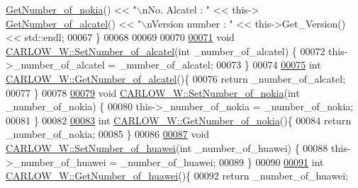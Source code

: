 \begin{DoxyCode}
      \hyperlink{class_c_a_r_l_o_w___w_a4e3a644ee69bc4bc4ab3feac1493192b}{GetNumber\_of\_nokia}() << \textcolor{stringliteral}{"\(\backslash\)nNo. Alcatel : "} << this->
      \hyperlink{class_c_a_r_l_o_w___w_ae7ab8852e5eeff1c2cd397126fbac0e7}{GetNumber\_of\_alcatel}() << \textcolor{stringliteral}{"\(\backslash\)nVersion number : "} << this->Get\_Version() << std::endl;
00067 \}
00068 
00069 
00070 
\hypertarget{_c_a_r_l_o_w___w_8cpp_source.tex_l00071}{}\hyperlink{class_c_a_r_l_o_w___w_ad264954806d7fd6c418650a5c7c7defb}{00071} \textcolor{keywordtype}{void} \hyperlink{class_c_a_r_l_o_w___w_ad264954806d7fd6c418650a5c7c7defb}{CARLOW\_W::SetNumber\_of\_alcatel}(\textcolor{keywordtype}{int} \_number\_of\_alcatel) \{
00072     this->\_number\_of\_alcatel = \_number\_of\_alcatel;
00073 \}
00074 
\hypertarget{_c_a_r_l_o_w___w_8cpp_source.tex_l00075}{}\hyperlink{class_c_a_r_l_o_w___w_ae7ab8852e5eeff1c2cd397126fbac0e7}{00075} \textcolor{keywordtype}{int} \hyperlink{class_c_a_r_l_o_w___w_ae7ab8852e5eeff1c2cd397126fbac0e7}{CARLOW\_W::GetNumber\_of\_alcatel}()\{
00076     \textcolor{keywordflow}{return} \_number\_of\_alcatel;
00077 \}
00078 
\hypertarget{_c_a_r_l_o_w___w_8cpp_source.tex_l00079}{}\hyperlink{class_c_a_r_l_o_w___w_af0f395409df02a42b3e9448d027d0776}{00079} \textcolor{keywordtype}{void} \hyperlink{class_c_a_r_l_o_w___w_af0f395409df02a42b3e9448d027d0776}{CARLOW\_W::SetNumber\_of\_nokia}(\textcolor{keywordtype}{int} \_number\_of\_nokia) \{
00080     this->\_number\_of\_nokia = \_number\_of\_nokia;
00081 \}
00082 
\hypertarget{_c_a_r_l_o_w___w_8cpp_source.tex_l00083}{}\hyperlink{class_c_a_r_l_o_w___w_a4e3a644ee69bc4bc4ab3feac1493192b}{00083} \textcolor{keywordtype}{int} \hyperlink{class_c_a_r_l_o_w___w_a4e3a644ee69bc4bc4ab3feac1493192b}{CARLOW\_W::GetNumber\_of\_nokia}()\{
00084     \textcolor{keywordflow}{return} \_number\_of\_nokia;
00085 \}
00086 
\hypertarget{_c_a_r_l_o_w___w_8cpp_source.tex_l00087}{}\hyperlink{class_c_a_r_l_o_w___w_a016d1d51b091fc1732c2923a3baa2f58}{00087} \textcolor{keywordtype}{void} \hyperlink{class_c_a_r_l_o_w___w_a016d1d51b091fc1732c2923a3baa2f58}{CARLOW\_W::SetNumber\_of\_huawei}(\textcolor{keywordtype}{int} \_number\_of\_huawei) \{
00088     this->\_number\_of\_huawei = \_number\_of\_huawei;
00089 \}
00090 
\hypertarget{_c_a_r_l_o_w___w_8cpp_source.tex_l00091}{}\hyperlink{class_c_a_r_l_o_w___w_aea38b51a44cda35a01beb7d45fa7a2a4}{00091} \textcolor{keywordtype}{int} \hyperlink{class_c_a_r_l_o_w___w_aea38b51a44cda35a01beb7d45fa7a2a4}{CARLOW\_W::GetNumber\_of\_huawei}()\{
00092     \textcolor{keywordflow}{return} \_number\_of\_huawei;

\end{DoxyCode}
